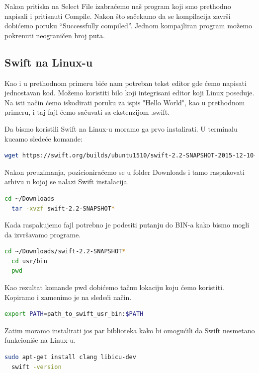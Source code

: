 \documentclass[a4paper]{article}
\begin{document}
Nakon pritiska na Select File izabraćemo naš program koji smo prethodno napisali i pritisnuti Compile. Nakon što sačekamo da se kompilacija završi dobićemo poruku “Successfully compiled”.
Jednom kompajliran program možemo pokrenuti neograničen broj puta.

\subsection{Swift na Linux-u}
\label{subsec:podnaslovLinux}

Kao i u prethodnom primeru biće nam potreban tekst editor gde ćemo napisati jednostavan kod.
Možemo koristiti bilo koji integrisani editor koji Linux poseduje. Na isti način ćemo iskodirati poruku za ispis "Hello World", kao u prethodnom primeru, i taj fajl ćemo sačuvati sa ekstenzijom .swift.

Da bismo koristili Swift na Linux-u moramo ga prvo instalirati. U terminalu kucamo sledeće komande:

\begin{lstlisting}[language=bash]
	wget https://swift.org/builds/ubuntu1510/swift-2.2-SNAPSHOT-2015-12-10-a/swift-2.2-SNAPSHOT-2015-12-10-a-ubuntu15.10.tar.gz

\end{lstlisting}
Nakon preuzimanja, pozicioniraćemo se u folder Downloads i tamo raspakovati arhivu u kojoj se nalazi Swift instalacija.

\begin{lstlisting}[language=bash]
  cd ~/Downloads
  tar -xvzf swift-2.2-SNAPSHOT*
\end{lstlisting}

Kada raspakujemo fajl potrebno je podesiti putanju do BIN-a kako bismo mogli da izvršavamo programe.

\begin{lstlisting}[language=bash]
  cd ~/Downloads/swift-2.2-SNAPSHOT*
  cd usr/bin
  pwd
\end{lstlisting}

Kao rezultat komande pwd dobićemo tačnu lokaciju koju ćemo koristiti. Kopiramo i zamenimo je na sledeći način.
\begin{lstlisting}[language=bash]
  export PATH=path_to_swift_usr_bin:$PATH

\end{lstlisting}

Zatim moramo instalirati jos par biblioteka kako bi omogućili da Swift nesmetano funkcioniše na Linux-u.

\begin{lstlisting}[language=bash]
  sudo apt-get install clang libicu-dev
  swift -version
\end{lstlisting}
\end{document}
